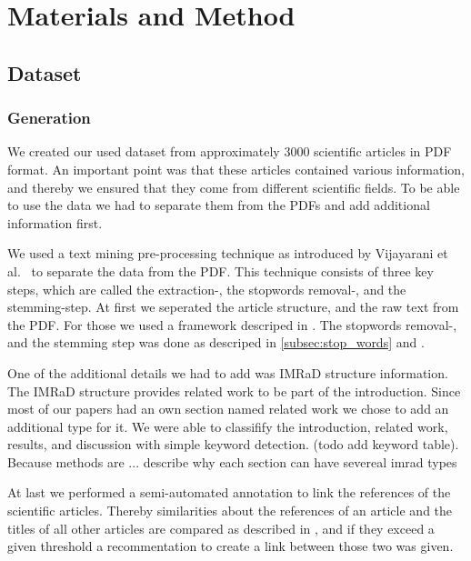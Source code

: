 \chapter{Materials and Method}
\label{cha:materials_and_method}

\section{Dataset}
\label{sec:dataset}

\subsection{Generation}
\label{subsec:generation}

We created our used dataset from approximately 3000 scientific articles in PDF format. An important point was that these articles contained various information, and thereby we ensured that they come from different scientific fields. To be able to use the data we had to separate them from the PDFs and add additional information first.

We used a text mining pre-processing technique as introduced by Vijayarani et al.~\cite{Vijayarani2015} to separate the data from the PDF. This technique consists of three key steps, which are called the extraction-, the stopwords removal-, and the stemming-step. At first we seperated the article structure, and the raw text from the PDF. For those we used a framework descriped in . The stopwords removal-, and the stemming step was done as descriped in \cref{subsec:stop_words} and .

One of the additional details we had to add was IMRaD structure information. The IMRaD structure provides related work to be part of the introduction. Since most of our papers had an own section named related work we chose to add an additional type for it. We were able to classifify the introduction, related work, results, and discussion with simple keyword detection. (todo add keyword table). Because methods are  ... describe why each section can have severeal imrad types

At last we performed a semi-automated annotation to link the references of the scientific articles. Thereby similarities about the references of an article and the titles of all other articles are compared as described in , and if they exceed a given threshold a recommentation to create a link between those two was given.

